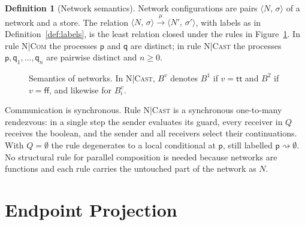 \documentclass[11pt]{article}
\makeatletter
\theoremstyle{plain}
\theoremstyle{definition}
\newtheorem{definition}[theorem]{Definition}
\theoremstyle{remark}
\newcommand{\ttrue}{\mathsf{tt}}
\newcommand{\ffalse}{\mathsf{ff}}
\newcommand{\seq}{;\;}
\newcommand{\pp}{\mathsf{p}}
\newcommand{\qq}{\mathsf{q}}
\newcommand{\eval}[3]{#1 \downarrow_{#2} #3}
\newcommand{\conf}[2]{\langle #1,\, #2\rangle}
\newcommand{\lto}[1]{\xrightarrow{\;#1\;}}
\newcommand{\tauat}[1]{\tau\mathord{@}#1}
\newcommand{\cast}[2]{#1 \rightsquigarrow #2}
\newcommand{\upd}[3]{#1[#2 \mapsto #3]}
\newcommand{\rn}[1]{{\normalfont\scshape #1}}
\newcommand{\sendbr}[4]{#1!#2 \mathbin{\triangleright} (#3,\, #4)}
\newcommand{\recvbr}[3]{#1?(#2,\, #3)}
\makeatother
\begin{document}
\begin{definition}[Network semantics]\label{def:net-sem}
  Network configurations are pairs $\conf{N}{\sigma}$ of a network and a
  store.  The relation $\conf{N}{\sigma}\lto{\mu}\conf{N'}{\sigma'}$, with
  labels as in Definition~\ref{def:labels}, is the least relation closed under
  the rules in Figure~\ref{fig:net-sem}.  In rule \rn{N|Com} the processes
  $\pp$ and $\qq$ are distinct; in rule \rn{N|Cast} the processes
  $\pp,\qq_1,\ldots,\qq_n$ are pairwise distinct and $n\geq 0$.
\end{definition}

\begin{figure}[t]
\caption{Semantics of networks.  In \rn{N|Cast}, $B^v$ denotes $B^1$ if $v=\ttrue$ and $B^2$ if $v=\ffalse$, and likewise for $B_i^v$.}
\label{fig:net-sem}
\end{figure}

Communication is synchronous.  Rule \rn{N|Cast} is a synchronous
one-to-many rendezvous: in a single step the sender evaluates its guard,
every receiver in $Q$ receives the boolean, and the sender and all receivers
select their continuations.  With $Q=\emptyset$ the rule degenerates to a
local conditional at $\pp$, still labelled $\cast{\pp}{\emptyset}$.  No
structural rule for parallel composition is needed because networks are
functions and each rule carries the untouched part of the network as $N$.

\section{Endpoint Projection}
\label{sec:epp}
\end{document}
